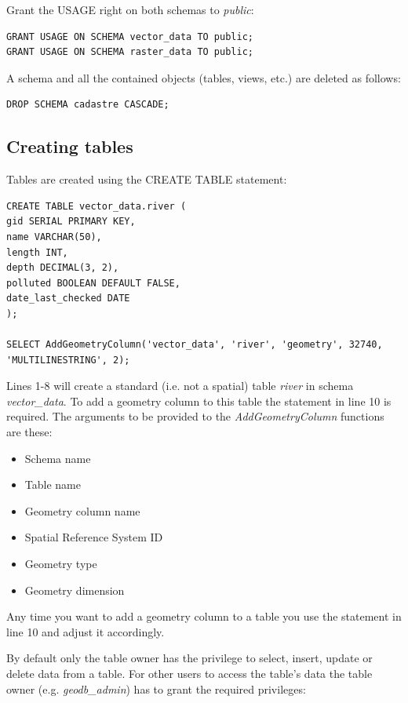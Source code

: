\documentclass[a4paper,12pt,titlepage]{article}
\begin{document}
Grant the USAGE right on both schemas to \textit{public}:

\begin{lstlisting}[caption={Granting USAGE privilege on example schemas}]
GRANT USAGE ON SCHEMA vector_data TO public;
GRANT USAGE ON SCHEMA raster_data TO public;
\end{lstlisting}

A schema and all the contained objects (tables, views, etc.) are deleted as follows:

\begin{lstlisting}[caption={Deleting a schema}]
DROP SCHEMA cadastre CASCADE;
\end{lstlisting}

\subsection{Creating tables}

Tables are created using the CREATE TABLE statement:

\begin{lstlisting}[caption={Creating a spatial table}]
CREATE TABLE vector_data.river (
gid SERIAL PRIMARY KEY,
name VARCHAR(50),
length INT,
depth DECIMAL(3, 2),
polluted BOOLEAN DEFAULT FALSE,
date_last_checked DATE
);

SELECT AddGeometryColumn('vector_data', 'river', 'geometry', 32740, 'MULTILINESTRING', 2);
\end{lstlisting}

Lines 1-8 will create a standard (i.e. not a spatial) table \textit{river} in schema \textit{vector\_data}. To add a geometry column to this table the statement in line 10 is required. The arguments to be provided to the \textit{AddGeometryColumn} functions are these:

\begin{itemize}
	\item Schema name
	\item Table name
	\item Geometry column name
	\item Spatial Reference System ID
	\item Geometry type
	\item Geometry dimension
\end{itemize}

Any time you want to add a geometry column to a table you use the statement in line 10 and adjust it accordingly.

By default only the table owner has the privilege to select, insert, update or delete data from a table. For other users to access the table's data the table owner (e.g. \textit{geodb\_admin}) has to grant the required privileges:
\end{document}
